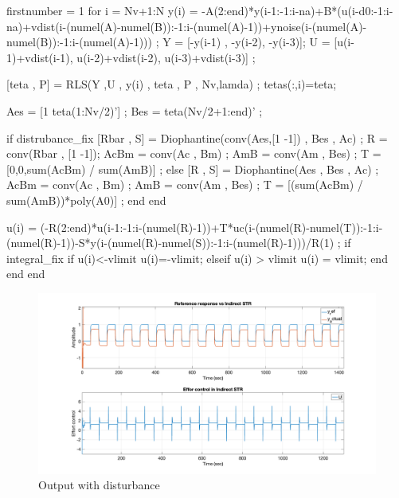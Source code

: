 \begin{code}
	\begin{matlabcode}{firstnumber = 1}
for i = Nv+1:N
	y(i) = -A(2:end)*y(i-1:-1:i-na)+B*(u(i-d0:-1:i-na)+vdist(i-(numel(A)-numel(B)):-1:i-(numel(A)-1))+ynoise(i-(numel(A)-numel(B)):-1:i-(numel(A)-1))) ;
	Y = [-y(i-1) , -y(i-2), -y(i-3)];
	U = [u(i-1)+vdist(i-1), u(i-2)+vdist(i-2), u(i-3)+vdist(i-3)] ;
	
	[teta , P] = RLS(Y ,U , y(i) , teta , P , Nv,lamda) ;
	tetas(:,i)=teta;
	
	Aes = [1 teta(1:Nv/2)'] ;
	Bes = teta(Nv/2+1:end)' ;
	
	if distrubance_fix
		[Rbar , S] = Diophantine(conv(Aes,[1 -1]) , Bes , Ac)  ;
		R = conv(Rbar , [1 -1]);
		AcBm = conv(Ac , Bm) ;
		AmB = conv(Am , Bes) ;
		T = [0,0,sum(AcBm) / sum(AmB)] ;
	else
		[R , S] = Diophantine(Aes , Bes , Ac)  ;
		AcBm = conv(Ac , Bm) ;
		AmB = conv(Am , Bes) ;
		T = [(sum(AcBm) / sum(AmB))*poly(A0)] ;
		end
	end
	
	u(i) = (-R(2:end)*u(i-1:-1:i-(numel(R)-1))+T*uc(i-(numel(R)-numel(T)):-1:i-(numel(R)-1))-S*y(i-(numel(R)-numel(S)):-1:i-(numel(R)-1)))/R(1) ;
	if integral_fix 
		if u(i)<-vlimit
			u(i)=-vlimit;
		elseif u(i) > vlimit
			u(i) = vlimit;
		end
	end
end
	\end{matlabcode}
\label{code:str82}
\end{code}

\begin{figure}
	\centering
	\includegraphics[width=\textwidth]{images/str81.png}
	\caption{Output with disturbance}
	\label{fig:str81}
\end{figure}

